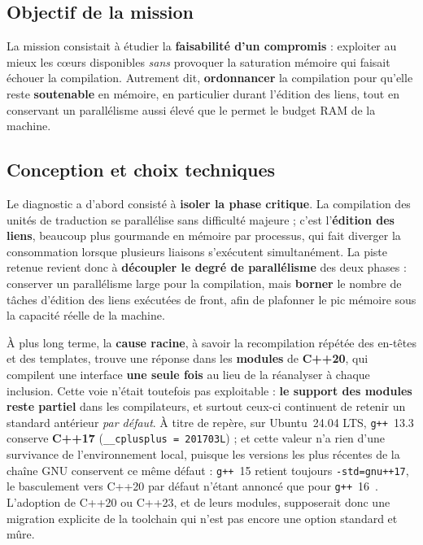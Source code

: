 \subsection{Objectif de la mission}
La mission consistait à étudier la \textbf{faisabilité d'un compromis} : exploiter
au mieux les cœurs disponibles \emph{sans} provoquer la saturation mémoire qui
faisait échouer la compilation. Autrement dit, \textbf{ordonnancer} la
compilation pour qu'elle reste \textbf{soutenable} en mémoire, en particulier
durant l'édition des liens, tout en conservant un parallélisme aussi élevé que
le permet le budget RAM de la machine.

\subsection{Conception et choix techniques}
Le diagnostic a d'abord consisté à \textbf{isoler la phase critique}. La
compilation des unités de traduction se parallélise sans difficulté majeure ;
c'est l'\textbf{édition des liens}, beaucoup plus gourmande en mémoire par
processus, qui fait diverger la consommation lorsque plusieurs liaisons
s'exécutent simultanément. La piste retenue revient donc à \textbf{découpler le
degré de parallélisme} des deux phases : conserver un parallélisme large pour la
compilation, mais \textbf{borner} le nombre de tâches d'édition des liens
exécutées de front, afin de plafonner le pic mémoire sous la capacité réelle de
la machine.

À plus long terme, la \textbf{cause racine}, à savoir la recompilation répétée
des en-têtes et des templates, trouve une réponse dans les \textbf{modules} de
\textbf{C++20}, qui compilent une interface \textbf{une seule fois} au lieu de la
réanalyser à chaque inclusion. Cette voie n'était toutefois pas exploitable :
\textbf{le support des modules reste partiel} dans les compilateurs, et surtout
ceux-ci continuent de retenir un standard antérieur \emph{par défaut}. À titre
de repère, sur Ubuntu~24.04 LTS, \texttt{g++}~13.3 conserve \textbf{C++17}
(\verb|__cplusplus = 201703L|) ; et cette valeur n'a rien d'une survivance de
l'environnement local, puisque les versions les plus récentes de la chaîne GNU
conservent ce même défaut : \texttt{g++}~15 retient toujours
\texttt{-std=gnu++17}, le basculement vers C++20 par défaut n'étant annoncé que
pour \texttt{g++}~16~\cite{gcc15changes}. L'adoption de C++20 ou C++23, et de
leurs modules, supposerait donc une migration explicite de la \gls{toolchain}
qui n'est pas encore une option standard et mûre.

